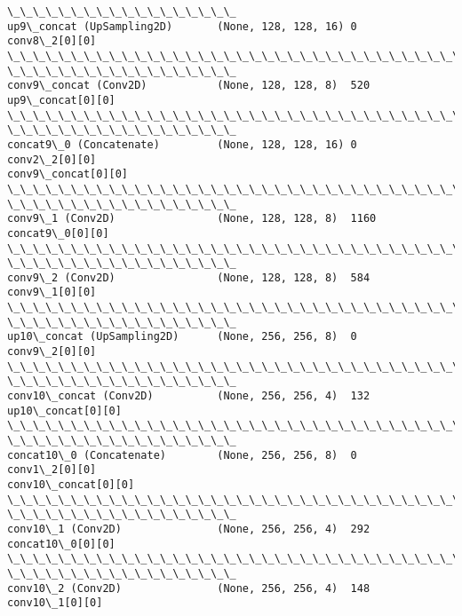 \documentclass[11pt]{article}
\begin{document}
\begin{Verbatim}[commandchars=\\\{\}]
\_\_\_\_\_\_\_\_\_\_\_\_\_\_\_\_\_\_
up9\_concat (UpSampling2D)       (None, 128, 128, 16) 0           conv8\_2[0][0]
\_\_\_\_\_\_\_\_\_\_\_\_\_\_\_\_\_\_\_\_\_\_\_\_\_\_\_\_\_\_\_\_\_\_\_\_\_\_\_\_\_\_\_\_\_\_\_\_\_\_\_\_\_\_\_\_\_\_\_\_\_\_\_\_\_\_\_\_\_\_\_\_\_\_\_\_\_\_\_\_
\_\_\_\_\_\_\_\_\_\_\_\_\_\_\_\_\_\_
conv9\_concat (Conv2D)           (None, 128, 128, 8)  520
up9\_concat[0][0]
\_\_\_\_\_\_\_\_\_\_\_\_\_\_\_\_\_\_\_\_\_\_\_\_\_\_\_\_\_\_\_\_\_\_\_\_\_\_\_\_\_\_\_\_\_\_\_\_\_\_\_\_\_\_\_\_\_\_\_\_\_\_\_\_\_\_\_\_\_\_\_\_\_\_\_\_\_\_\_\_
\_\_\_\_\_\_\_\_\_\_\_\_\_\_\_\_\_\_
concat9\_0 (Concatenate)         (None, 128, 128, 16) 0           conv2\_2[0][0]
conv9\_concat[0][0]
\_\_\_\_\_\_\_\_\_\_\_\_\_\_\_\_\_\_\_\_\_\_\_\_\_\_\_\_\_\_\_\_\_\_\_\_\_\_\_\_\_\_\_\_\_\_\_\_\_\_\_\_\_\_\_\_\_\_\_\_\_\_\_\_\_\_\_\_\_\_\_\_\_\_\_\_\_\_\_\_
\_\_\_\_\_\_\_\_\_\_\_\_\_\_\_\_\_\_
conv9\_1 (Conv2D)                (None, 128, 128, 8)  1160        concat9\_0[0][0]
\_\_\_\_\_\_\_\_\_\_\_\_\_\_\_\_\_\_\_\_\_\_\_\_\_\_\_\_\_\_\_\_\_\_\_\_\_\_\_\_\_\_\_\_\_\_\_\_\_\_\_\_\_\_\_\_\_\_\_\_\_\_\_\_\_\_\_\_\_\_\_\_\_\_\_\_\_\_\_\_
\_\_\_\_\_\_\_\_\_\_\_\_\_\_\_\_\_\_
conv9\_2 (Conv2D)                (None, 128, 128, 8)  584         conv9\_1[0][0]
\_\_\_\_\_\_\_\_\_\_\_\_\_\_\_\_\_\_\_\_\_\_\_\_\_\_\_\_\_\_\_\_\_\_\_\_\_\_\_\_\_\_\_\_\_\_\_\_\_\_\_\_\_\_\_\_\_\_\_\_\_\_\_\_\_\_\_\_\_\_\_\_\_\_\_\_\_\_\_\_
\_\_\_\_\_\_\_\_\_\_\_\_\_\_\_\_\_\_
up10\_concat (UpSampling2D)      (None, 256, 256, 8)  0           conv9\_2[0][0]
\_\_\_\_\_\_\_\_\_\_\_\_\_\_\_\_\_\_\_\_\_\_\_\_\_\_\_\_\_\_\_\_\_\_\_\_\_\_\_\_\_\_\_\_\_\_\_\_\_\_\_\_\_\_\_\_\_\_\_\_\_\_\_\_\_\_\_\_\_\_\_\_\_\_\_\_\_\_\_\_
\_\_\_\_\_\_\_\_\_\_\_\_\_\_\_\_\_\_
conv10\_concat (Conv2D)          (None, 256, 256, 4)  132
up10\_concat[0][0]
\_\_\_\_\_\_\_\_\_\_\_\_\_\_\_\_\_\_\_\_\_\_\_\_\_\_\_\_\_\_\_\_\_\_\_\_\_\_\_\_\_\_\_\_\_\_\_\_\_\_\_\_\_\_\_\_\_\_\_\_\_\_\_\_\_\_\_\_\_\_\_\_\_\_\_\_\_\_\_\_
\_\_\_\_\_\_\_\_\_\_\_\_\_\_\_\_\_\_
concat10\_0 (Concatenate)        (None, 256, 256, 8)  0           conv1\_2[0][0]
conv10\_concat[0][0]
\_\_\_\_\_\_\_\_\_\_\_\_\_\_\_\_\_\_\_\_\_\_\_\_\_\_\_\_\_\_\_\_\_\_\_\_\_\_\_\_\_\_\_\_\_\_\_\_\_\_\_\_\_\_\_\_\_\_\_\_\_\_\_\_\_\_\_\_\_\_\_\_\_\_\_\_\_\_\_\_
\_\_\_\_\_\_\_\_\_\_\_\_\_\_\_\_\_\_
conv10\_1 (Conv2D)               (None, 256, 256, 4)  292
concat10\_0[0][0]
\_\_\_\_\_\_\_\_\_\_\_\_\_\_\_\_\_\_\_\_\_\_\_\_\_\_\_\_\_\_\_\_\_\_\_\_\_\_\_\_\_\_\_\_\_\_\_\_\_\_\_\_\_\_\_\_\_\_\_\_\_\_\_\_\_\_\_\_\_\_\_\_\_\_\_\_\_\_\_\_
\_\_\_\_\_\_\_\_\_\_\_\_\_\_\_\_\_\_
conv10\_2 (Conv2D)               (None, 256, 256, 4)  148         conv10\_1[0][0]

\end{Verbatim}
\end{document}
